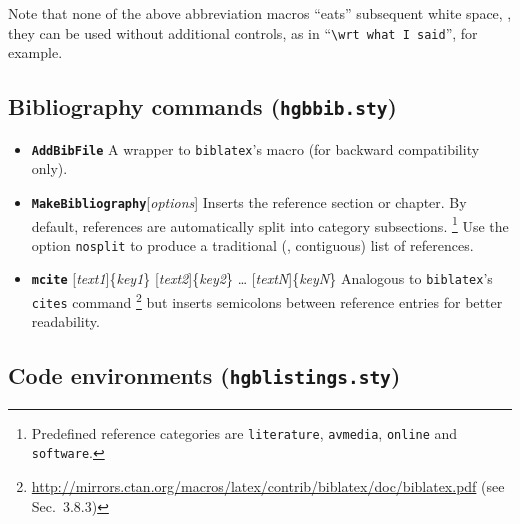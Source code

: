 \documentclass[english]{hgbarticle}
\begin{document}
\noindent
Note that none of the above abbreviation macros ``eats'' subsequent white
space, \ie, they can be used without additional controls, as in
``\verb!\wrt what I said!'', for example.

\subsection{Bibliography commands (\texttt{hgbbib.sty})}

\begin{itemize}
    \item 
    \textbf{\texttt{{\bs}AddBibFile}}\newline
    A wrapper to \texttt{biblatex}'s \verb!! macro (for backward compatibility only).
    \item
    \textbf{\texttt{{\bs}MakeBibliography}}[\emph{options}]
    \newline
    Inserts the
    reference section or chapter. By default, references are automatically
    split into category subsections.%
    \footnote{Predefined reference categories are \texttt{literature},
        \texttt{avmedia}, \texttt{online} and \texttt{software}.}
    Use the option \texttt{nosplit} to produce a traditional (\ie,
    contiguous) list of references.
    \item
    \textbf{\texttt{{\bs}mcite}}%
        [\emph{text1}]\{\emph{key1}\}%
        [\emph{text2}]\{\emph{key2}\}%
        \ldots
        [\emph{textN}]\{\emph{keyN}\}%
    \newline
    Analogous to \texttt{bib\-la\-tex}'s \texttt{{\bs}cites} command%
    \footnote{%
    \url{http://mirrors.ctan.org/macros/latex/contrib/biblatex/doc/biblatex.pdf}
    (see Sec.~3.8.3)} but inserts semicolons between reference entries for
    better readability.
\end{itemize}



\subsection{Code environments (\texttt{hgblistings.sty})}
\end{document}
